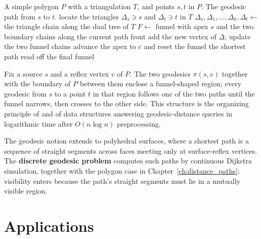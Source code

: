 \begin{algorithm}[htbp]
\caption{Shortest Path in a Triangulated Polygon (Funnel Algorithm)}
\label{alg:vis_funnel}
\begin{algorithmic}[1]
\Require A simple polygon $P$ with a triangulation $T$, and points $s, t$ in $P$.
\Ensure The geodesic path from $s$ to $t$.
  \State locate the triangles $\Delta_s \ni s$ and $\Delta_t \ni t$ in $T$
  \State $\Delta_s, \Delta_1, \dots, \Delta_k, \Delta_t \gets$ the triangle chain along the dual tree of $T$
  \State $F \gets$ funnel with apex $s$ and the two boundary chains along the current path front
    \State add the new vertex of $\Delta$; update the two funnel chains
      \State advance the apex to $c$ and reset the funnel
    \EndIf
  \EndFor
  \State \Return the shortest path read off the final funnel
\EndFunction
\end{algorithmic}
\end{algorithm}

\begin{example}\label{exa:vis_funnel}
  Fix a source $s$ and a reflex vertex $v$ of $P$. The two geodesics
  $\pi(s,v)$ together with the boundary of $P$ between them enclose a
  funnel-shaped region; every geodesic from $s$ to a point $t$ in that
  region follows one of the two paths until the funnel narrows, then
  crosses to the other side. This structure is the organizing principle of
  \cite{guibas1987vis} and of data structures answering geodesic-distance
  queries in logarithmic time after $O(n \log n)$ preprocessing.
\end{example}

The geodesic notion extends to polyhedral surfaces, where a shortest path
is a sequence of straight segments across faces meeting only at surface-reflex
vertices. The \textbf{discrete geodesic problem} \cite{mitchell1987} computes
such paths by continuous Dijkstra simulation, together with the polygon case
in Chapter~\ref{ch:distance_paths}; visibility enters because the path's
straight segments must lie in a mutually visible region.


\section{Applications}
\label{sec:visibility_applications}

